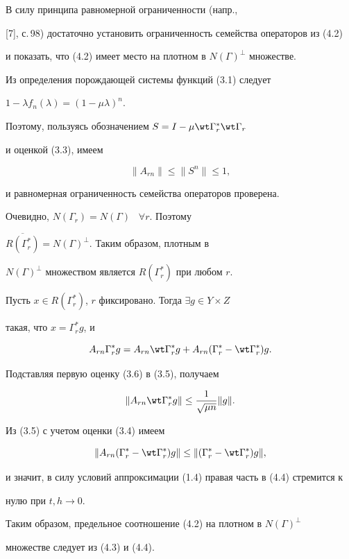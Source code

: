 \begin{pf}


В силу принципа равномерной ограниченности (напр., 


[7], с.\,98) достаточно установить ограниченность семейства операторов из (4.2) 


и показать, что (4.2) имеет место на плотном в $N(\Gamma)^\bot$ множестве.


Из определения порождающей системы функций (3.1) следует


$1-\lambda f_n(\lambda)=(1-\mu\lambda)^n$.


Поэтому, пользуясь обозначением $S=I-\mu\wt \Gamma_r^* \wt \Gamma_r$


и оценкой (3.3), имеем


$$


\|A_{rn}\|\le \|S^n\| \le 1,


$$


и равномерная ограниченность семейства операторов проверена.


Очевидно, $N(\Gamma_r)=N(\Gamma)$ \, $\forall r$. Поэтому 


$\overline{R(\Gamma_r^*)}=N(\Gamma)^\bot$. Таким образом, плотным в 


$N(\Gamma)^\bot$ множеством является $R(\Gamma^*_r)$ при любом $r$.


Пусть $x\in R(\Gamma_r^*)$, $r$ фиксировано. Тогда $\exists g\in Y\times Z$ 


такая, что $x=\Gamma_r^*g$, и 


$$


A_{rn}\Gamma_r^*g=A_{rn}\wt\Gamma_r^*g+


A_{rn}(\Gamma_r^*-\wt \Gamma_r^*)g.


$$


Подставляя первую оценку (3.6) в (3.5), получаем


\begin{equation}


\|A_{rn}\wt\Gamma_r^*g\| \le \frac{1}{\sqrt{\mu n}}\|g\|.


\end{equation}


Из (3.5) с учетом оценки (3.4) имеем


\begin{equation}


\|A_{rn}(\Gamma_r^*-\wt \Gamma_r^*)g\| \le \|(\Gamma_r^*-\wt \Gamma_r^*)g\|,


\end{equation}


и значит, в силу условий аппроксимации (1.4) правая часть в (4.4) стремится к 


нулю при $t, h \to 0$.


Таким образом, предельное соотношение (4.2) на плотном в $N(\Gamma)^\bot$ 


множестве следует из (4.3) и (4.4).


\end{pf}








